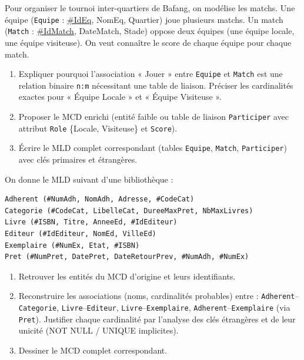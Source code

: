 \documentclass[11pt]{article}
\begin{document}
\begin{exercice}
Pour organiser le tournoi inter-quartiers de Bafang, on modélise les matchs. Une équipe (\texttt{Equipe} : \underline{\#IdEq}, NomEq, Quartier) joue plusieurs matchs. Un match (\texttt{Match} : \underline{\#IdMatch}, DateMatch, Stade) oppose deux équipes (une équipe locale, une équipe visiteuse). On veut connaître le score de chaque équipe pour chaque match.
\begin{enumerate}
    \item Expliquer pourquoi l'association « Jouer » entre \texttt{Equipe} et \texttt{Match} est une relation binaire \texttt{n:m} nécessitant une table de liaison. Préciser les cardinalités exactes pour « Équipe Locale » et « Équipe Visiteuse ».
    \item Proposer le MCD enrichi (entité faible ou table de liaison \texttt{Participer} avec attribut \texttt{Role} \{Locale, Visiteuse\} et \texttt{Score}).
    \item Écrire le MLD complet correspondant (tables \texttt{Equipe}, \texttt{Match}, \texttt{Participer}) avec clés primaires et étrangères.
\end{enumerate}
\end{exercice}

\begin{exercice}
On donne le MLD suivant d'une bibliothèque :
\begin{verbatim}
Adherent (#NumAdh, NomAdh, Adresse, #CodeCat)
Categorie (#CodeCat, LibelleCat, DureeMaxPret, NbMaxLivres)
Livre (#ISBN, Titre, AnneeEd, #IdEditeur)
Editeur (#IdEditeur, NomEd, VilleEd)
Exemplaire (#NumEx, Etat, #ISBN)
Pret (#NumPret, DatePret, DateRetourPrev, #NumAdh, #NumEx)
\end{verbatim}
\begin{enumerate}
    \item Retrouver les entités du MCD d'origine et leurs identifiants.
    \item Reconstruire les associations (noms, cardinalités probables) entre : \texttt{Adherent}--\texttt{Categorie}, \texttt{Livre}--\texttt{Editeur}, \texttt{Livre}--\texttt{Exemplaire}, \texttt{Adherent}--\texttt{Exemplaire} (via \texttt{Pret}). Justifier chaque cardinalité par l'analyse des clés étrangères et de leur unicité (NOT NULL / UNIQUE implicites).
    \item Dessiner le MCD complet correspondant.
\end{enumerate}
\end{exercice}
\end{document}
